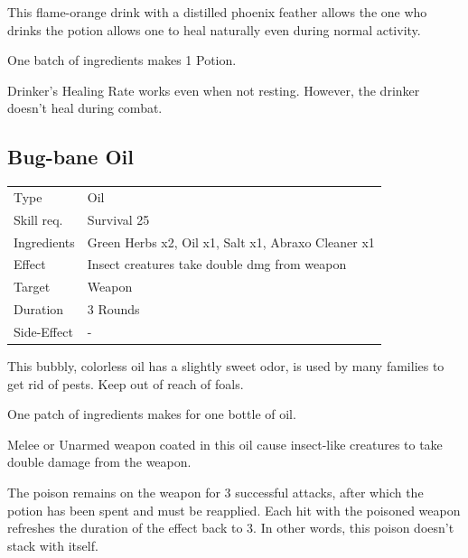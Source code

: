 \documentclass[11pt,a4paper,twocolumn]{book}
\begin{document}
\medskip

This flame-orange drink with a distilled phoenix feather allows the one who drinks the potion allows one to heal naturally even during normal activity.

One batch of ingredients makes 1 Potion.

Drinker's Healing Rate works even when not resting. However, the drinker doesn't heal during combat.


\subsection*{Bug-bane Oil}
{
	\begin{tabu} to 75mm{| X[l,4] | X[l,8] |}
		\hline
		Type 			& Oil 														\\
        Skill req.	    & Survival 25 												\\
        Ingredients     & Green Herbs x2, Oil x1, Salt x1, Abraxo Cleaner x1		\\
        Effect     		& Insect creatures take double dmg from weapon				\\
        Target      	& Weapon													\\
        Duration  		& 3 Rounds	 												\\
        Side-Effect     & -															\\ \hline
	\end{tabu}
		
}

\medskip

This bubbly, colorless oil has a slightly sweet odor, is used by many families to get rid of pests. Keep out of reach of foals.

One patch of ingredients makes for one bottle of oil.

Melee or Unarmed weapon coated in this oil cause insect-like creatures to take double damage from the weapon.

The poison remains on the weapon for 3 successful attacks, after which the potion has been spent and must be reapplied. Each hit with the poisoned weapon refreshes the duration of the effect back to 3. In other words, this poison doesn't stack with itself.
\end{document}
